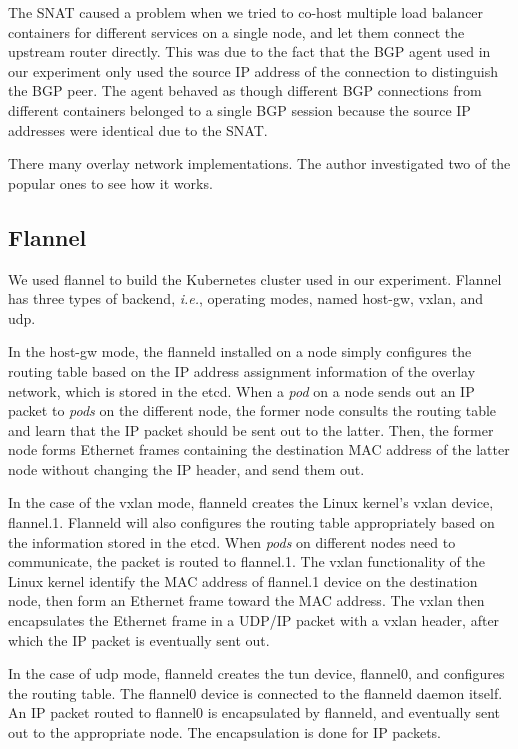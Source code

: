 The SNAT caused a problem when we tried to co-host multiple load balancer containers for different services on a single node, and let them connect the upstream router directly.
This was due to the fact that the BGP agent used in our experiment only used the source IP address of the connection to distinguish the BGP peer.
The agent behaved as though different BGP connections from different containers belonged to a single BGP session because the source IP addresses were identical due to the SNAT.

There many overlay network implementations.
The author investigated two of the popular ones to see how it works.

\subsection{Flannel}

We used flannel to build the Kubernetes cluster used in our experiment.
Flannel has three types of backend, {\it i.e.}, operating modes, named host-gw, vxlan, and udp\cite{CoreOSFlannelBackend}.

In the host-gw mode, the flanneld installed on a node simply configures the routing table 
based on the IP address assignment information of the overlay network, which is stored in the etcd. 
When a {\em pod} on a node sends out an IP packet to {\em pods} on the different node, 
the former node consults the routing table and learn that the IP packet should be sent out to the latter.
Then, the former node forms Ethernet frames containing the destination MAC address of the latter node 
without changing the IP header, and send them out.

In the case of the vxlan mode, flanneld creates the Linux kernel's vxlan device, flannel.1. 
Flanneld will also configures the routing table appropriately based on the information stored in the etcd.
When {\em pods} on different nodes need to communicate, the packet is routed to flannel.1.
The vxlan functionality of the Linux kernel identify the MAC address of flannel.1 device on the destination node,
then form an Ethernet frame toward the MAC address.
The vxlan then encapsulates the Ethernet frame in a UDP/IP packet with a vxlan header, after which the IP packet is eventually sent out.

In the case of udp mode, flanneld creates the tun device, flannel0, and configures the routing table.
The flannel0 device is connected to the flanneld daemon itself.
An IP packet routed to flannel0 is encapsulated by flanneld, and eventually sent out 
to the appropriate node. 
The encapsulation is done for IP packets.

